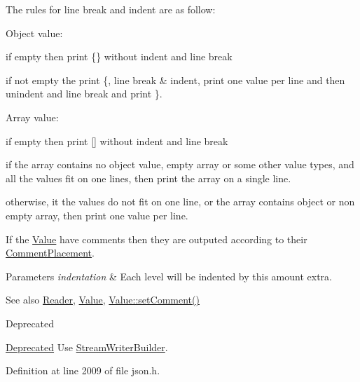 The rules for line break and indent are as follow\+:
\begin{DoxyItemize}
\item Object value\+:
\begin{DoxyItemize}
\item if empty then print \{\} without indent and line break
\item if not empty the print \textquotesingle{}\{\textquotesingle{}, line break \& indent, print one value per line and then unindent and line break and print \textquotesingle{}\}\textquotesingle{}.
\end{DoxyItemize}
\item Array value\+:
\begin{DoxyItemize}
\item if empty then print \mbox{[}\mbox{]} without indent and line break
\item if the array contains no object value, empty array or some other value types, and all the values fit on one lines, then print the array on a single line.
\item otherwise, it the values do not fit on one line, or the array contains object or non empty array, then print one value per line.
\end{DoxyItemize}
\end{DoxyItemize}

If the \hyperlink{class_json_1_1_value}{Value} have comments then they are outputed according to their \hyperlink{namespace_json_a4fc417c23905b2ae9e2c47d197a45351}{Comment\+Placement}.


\begin{DoxyParams}{Parameters}
{\em indentation} & Each level will be indented by this amount extra. \\
\hline
\end{DoxyParams}
\begin{DoxySeeAlso}{See also}
\hyperlink{class_json_1_1_reader}{Reader}, \hyperlink{class_json_1_1_value}{Value}, \hyperlink{class_json_1_1_value_a29f3a30f7e5d3af6f38d57999bf5b480}{Value\+::set\+Comment()} 
\end{DoxySeeAlso}
\begin{DoxyRefDesc}{Deprecated}
\item[\hyperlink{deprecated__deprecated000020}{Deprecated}]Use \hyperlink{class_json_1_1_stream_writer_builder}{Stream\+Writer\+Builder}. \end{DoxyRefDesc}


Definition at line 2009 of file json.\+h.



